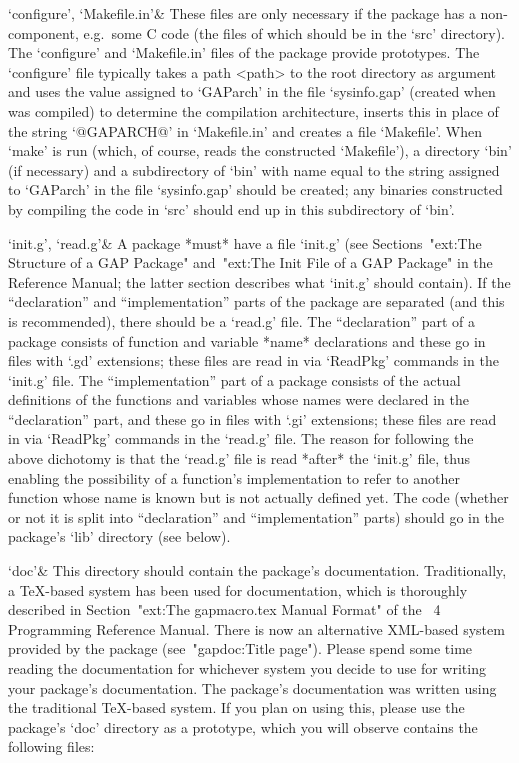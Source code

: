 `configure', `Makefile.in'&
These files are only necessary if the package has a non-{\GAP} component,
e.g.~some C code (the files of which should be in the  `src'  directory).
The `configure' and `Makefile.in' files of the {\Example} package provide
prototypes. The `configure' file typically takes a  path  <path>  to  the
{\GAP} root  directory  as  argument  and  uses  the  value  assigned  to
`GAParch' in the file `sysinfo.gap' (created when {\GAP} was compiled) to
determine the compilation architecture, inserts  this  in  place  of  the
string `@GAPARCH@' in `Makefile.in' and creates a file  `Makefile'.  When
`make' is run (which, of course, reads  the  constructed  `Makefile'),  a
directory `bin' (if necessary) and a  subdirectory  of  `bin'  with  name
equal to the string assigned  to  `GAParch'  in  the  file  `sysinfo.gap'
should be created; any binaries constructed  by  compiling  the  code  in
`src' should end up in this subdirectory of `bin'.

`init.g', `read.g'&
A {\GAP} package *must*  have  a  file  `init.g'  (see  Sections~"ext:The
Structure of a GAP Package" and~"ext:The Init File of a GAP  Package"  in
the Reference Manual; the latter section describes what  `init.g'  should
contain). If the ``declaration''  and  ``implementation''  parts  of  the
package are separated (and  this  is  recommended),  there  should  be  a
`read.g' file. The ``declaration'' part of a package consists of function
and variable *name*  declarations  and  these  go  in  files  with  `.gd'
extensions; these files  are  read  in  via  `ReadPkg'  commands  in  the
`init.g' file. The ``implementation'' part of a package consists  of  the
actual definitions of  the  functions  and  variables  whose  names  were
declared in the ``declaration'' part, and these go in  files  with  `.gi'
extensions; these files  are  read  in  via  `ReadPkg'  commands  in  the
`read.g' file. The reason for following the above dichotomy is  that  the
`read.g' file is read  *after*  the  `init.g'  file,  thus  enabling  the
possibility of a function's implementation to refer to  another  function
whose name is known but is not actually  defined  yet.  The  {\GAP}  code
(whether or not it is split into ``declaration''  and  ``implementation''
parts) should go in the package's `lib' directory (see below).

`doc'&
This directory should contain the package's documentation. Traditionally,
a {\TeX}-based system has been used for {\GAP}  documentation,  which  is
thoroughly described in Section~"ext:The gapmacro.tex Manual  Format"  of
the {\GAP}~4 Programming Reference Manual. There is  now  an  alternative
XML-based  system  provided  by  the  {\GAP}   package   
(see~"gapdoc:Title  page").  Please   spend   some   time   reading   the
documentation for whichever system you decide to  use  for  writing  your
package's  documentation.  The  {\Example}  package's  documentation  was
written using the traditional {\TeX}-based system. If you plan  on  using
this, please use the {\Example} package's `doc' directory as a prototype,
which you will observe contains the following files:

